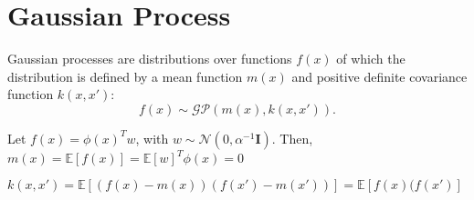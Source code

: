 \section{Gaussian Process}
\label{sec:gaussian_process}
Gaussian processes are distributions over functions $f(x)$ of which the distribution is defined by a mean function $m(x)$ and positive definite covariance function $k(x,x')$:
$$f(x) \sim \mathcal{GP}(m(x),k(x,x')).$$

Let $f(x) = \phi(x)^Tw$, with $w\sim \mathcal{N}(0, \alpha^{-1}\mathbf{I})$. Then, $m(x) = \mathbb{E}[f(x)] = \mathbb{E}[w]^T\phi(x) = 0$

$k(x, x') = \mathbb{E}[(f(x)-m(x))(f(x')-m(x'))] =\mathbb{E}[f(x)(f(x')] $

